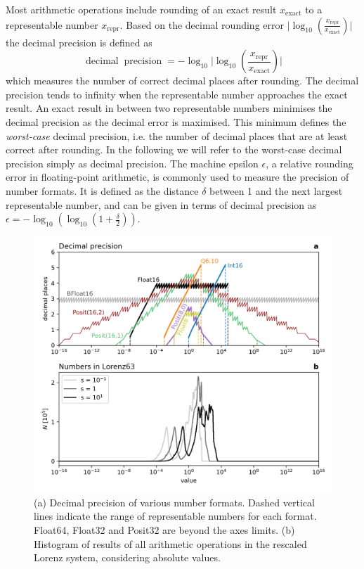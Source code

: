 \documentclass[draft]{agujournal2019}
\newcommand{\op}{\operatorname}
\begin{document}
Most arithmetic operations include rounding of an exact result $x_\text{exact}$
to a representable number $x_\text{repr}$. Based on the decimal rounding error
$\vert \log_{10}( \tfrac{x_\text{repr}}{x_\text{exact}} ) \vert$ the decimal precision
is defined as \cite{Gustafson2017}
\begin{equation}
\op{decimal} \op{precision} = -\log_{10} \vert \log_{10}( \frac{x_\text{repr}}{x_\text{exact}} ) \vert
\end{equation}
which measures the number of correct decimal places after rounding. The decimal precision tends to infinity when the representable number approaches the exact result. An exact result in between two representable numbers minimises the decimal precision as the decimal error is maximised. This minimum defines the \emph{worst-case} decimal precision, i.e. the number of decimal places that are at least correct after rounding. In the following we will refer to the worst-case decimal precision simply as decimal precision.
The machine epsilon $\epsilon$, a relative rounding error in floating-point arithmetic,
is commonly used to measure the precision of number formats. It is defined as the
distance $\delta$ between 1 and the next largest representable number, and can be
given in terms of decimal precision as $\epsilon = -\log_{10} ( \log_{10}( 1 + \tfrac{\delta}{2} ))$.

\begin{figure}[htbp]
\includegraphics[width=1\textwidth]{decimal_precision.png}
\caption{(a) Decimal precision of various number formats. Dashed vertical lines indicate the range of representable numbers for each format. Float64, Float32 and Posit32 are beyond the axes limits. (b) Histogram of results of all arithmetic operations in the rescaled Lorenz system, considering absolute values.}
\label{fig:dec_prec}
\end{figure}
\end{document}
